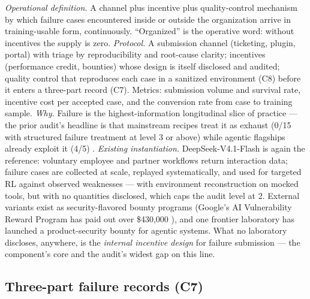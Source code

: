 \documentclass[10pt]{article}
\begin{document}
\emph{Operational definition.} A channel plus incentive plus quality-control mechanism by which failure cases encountered inside or outside the organization arrive in training-usable form, continuously. ``Organized'' is the operative word: without incentives the supply is zero. \emph{Protocol.} A submission channel (ticketing, plugin, portal) with triage by reproducibility and root-cause clarity; incentives (performance credit, bounties) whose design is itself disclosed and audited; quality control that reproduces each case in a sanitized environment (C8) before it enters a three-part record (C7). Metrics: submission volume and survival rate, incentive cost per accepted case, and the conversion rate from case to training sample. \emph{Why.} Failure is the highest-information longitudinal slice of practice --- the prior audit's headline is that mainstream recipes treat it as exhaust (0/15 with structured failure treatment at level 3 or above) while agentic flagships already exploit it (4/5) \cite{ref6}. \emph{Existing instantiation.} DeepSeek-V4.1-Flash is again the reference: voluntary employee and partner workflows return interaction data; failure cases are collected at scale, replayed systematically, and used for targeted RL against observed weaknesses \cite{ref20} --- with environment reconstruction on mocked tools, but with no quantities disclosed, which caps the audit level at 2. External variants exist as security-flavored bounty programs (Google's AI Vulnerability Reward Program has paid out over \$430,000 \cite{ref23}), and one frontier laboratory has launched a product-security bounty for agentic systems. What no laboratory discloses, anywhere, is the \emph{internal incentive design} for failure submission --- the component's core and the audit's widest gap on this line.

\subsection{Three-part failure records (C7)}
\end{document}
